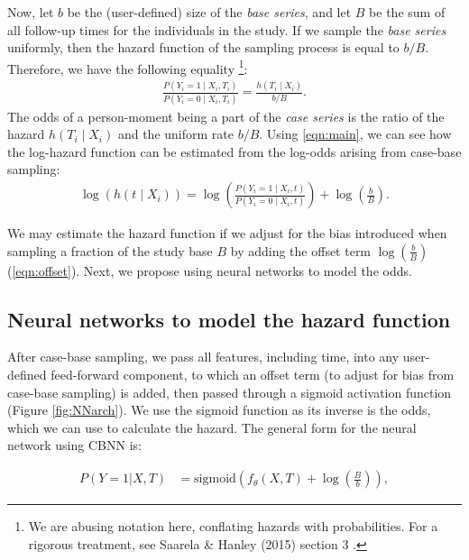 \documentclass[AMA,STIX1COL,]{WileyNJD-v2}
\begin{document}
Now, let \(b\) be the (user-defined) size of the \emph{base series}, and
let \(B\) be the sum of all follow-up times for the individuals in the
study. If we sample the \emph{base series} uniformly, then the hazard
function of the sampling process is equal to \(b/B\). Therefore, we have
the following equality
\footnote{We are abusing notation here, conflating hazards with probabilities. For a rigorous treatment, see Saarela \& Hanley (2015) section 3 \cite{saarela2015} .}:
\begin{align}\label{eqn:main}
\frac{P\left(Y_i=1 \mid X_i, T_i\right)}{P\left(Y_i = 0 \mid X_i, T_i\right)} = \frac{h\left(T_i \mid X_i\right)}{b/B}.
\end{align} The odds of a person-moment being a part of the \emph{case
series} is the ratio of the hazard \(h(T_i \mid X_i)\) and the uniform
rate \(b/B\). Using \eqref{eqn:main}, we can see how the log-hazard
function can be estimated from the log-odds arising from case-base
sampling: \begin{align}\label{eqn:offset}
\log \left( h\left(t \mid X_i\right)\right) = \log \left(\frac{P\left(Y_i = 1 \mid X_i, t\right)}{P\left(Y_i = 0 \mid X_i, t\right)}\right) + \log\left(\frac{b}{B}\right).
\end{align}

We may estimate the hazard function if we adjust for the bias introduced
when sampling a fraction of the study base \(B\) by adding the offset
term \(\log\left(\frac{b}{B} \right)\) (\eqref{eqn:offset}). Next, we
propose using neural networks to model the odds.

\hypertarget{neural-networks-to-model-the-hazard-function}{%
\subsection{Neural networks to model the hazard
function}\label{neural-networks-to-model-the-hazard-function}}

After case-base sampling, we pass all features, including time, into any
user-defined feed-forward component, to which an offset term (to adjust
for bias from case-base sampling) is added, then passed through a
sigmoid activation function (Figure \ref{fig:NNarch}). We use the
sigmoid function as its inverse is the odds, which we can use to
calculate the hazard. The general form for the neural network using CBNN
is:

\begin{align}\label{eqn:nnProb}
P\left(Y=1|X,T\right)&=\mathrm{sigmoid}\left(f_{\theta}(X, T) + \log\left(\frac{B}{b}\right) \right),
\end{align}
\end{document}
